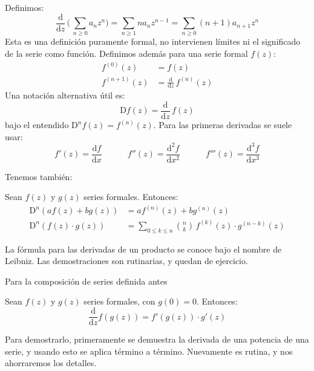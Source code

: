   Definimos:%
  \begin{equation*}
    \frac{\mathrm{d}}{\mathrm{d} z} \,
      \biggl( \, \sum_{n \ge 0} a_n z^n \biggr)
      = \sum_{n \ge 1} n a_n z^{n - 1}
      = \sum_{n \ge 0} (n + 1) a_{n + 1} z^n
  \end{equation*}
  Esta es una definición puramente formal,
  no intervienen límites ni el significado de la serie como función.
  Definimos además para una serie formal \(f(z)\):
  \begin{align*}
    f^{(0)}(z)
      &= f(z) \\
    f^{(n + 1)}(z)
      &= \frac{\mathrm{d}}{\mathrm{d} z} \, f^{(n)}(z)
  \end{align*}
  Una notación alternativa útil es:
  \begin{equation*}
    \mathrm{D} f(z)
      = \frac{\mathrm{d}}{\mathrm{d} z} \, f(z)
  \end{equation*}
  bajo el entendido \(\mathrm{D}^n f(z) = f^{(n)}(z)\).
  Para las primeras derivadas se suele usar:
  \begin{equation*}
    f'(z)
      = \frac{\mathrm{d} f}{\mathrm{d} x}
    \hspace{3em}
    f''(z)
      = \frac{\mathrm{d}^2 f}{\mathrm{d} x^2}
    \hspace{3em}
    f'''(z)
      = \frac{\mathrm{d}^3 f}{\mathrm{d} x^3}
  \end{equation*}

  Tenemos también:
  \begin{theorem}
    \label{theo:derivadas-series}
    Sean \(f(z)\) y \(g(z)\) series formales.
    Entonces:
    \begin{align*}
      \mathrm{D}^n \left( a f(z) + b g(z)\right)
	&= a f^{(n)}(z) + b g^{(n)}(z) \\
      \mathrm{D}^n \left(f(z) \cdot g(z)\right)
	&= \sum_{0 \le k \le n} \binom{n}{k} \, f^{(k)}(z) \cdot g^{(n - k)}(z)
    \end{align*}
  \end{theorem}
  La fórmula para las derivadas de un producto
  se conoce bajo el nombre de Leibniz.
  Las demostraciones son rutinarias,
  y quedan de ejercicio.

  Para la composición de series definida antes
  \begin{theorem}
    \label{theo:cadena-series}
    Sean \(f(z)\) y \(g(z)\) series formales,
    con \(g(0) = 0\).
    Entonces:
    \begin{equation*}
      \frac{\mathrm{d}}{\mathrm{d} z} f(g(z))
	= f'(g(z)) \cdot g'(z)
    \end{equation*}
  \end{theorem}
  Para demostrarlo,
  primeramente se demuestra la derivada de una potencia de una serie,
  y usando esto se aplica término a término.
  Nuevamente es rutina,
  y nos ahorraremos los detalles.

